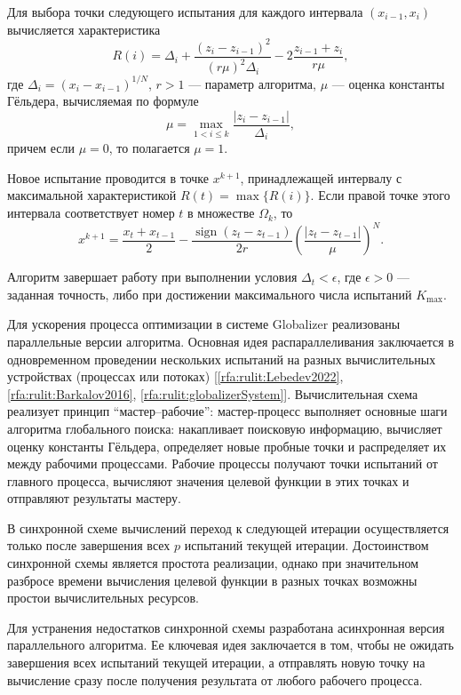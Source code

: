 \documentclass[10pt,a4paper]{book}
\begin{document}
Для выбора точки следующего испытания для каждого интервала $(x_{i-1}, x_i)$ вычисляется характеристика
\begin{equation}
R(i) = \Delta_i + \frac{(z_i - z_{i-1})^2}{(r\mu)^2\Delta_i} - 2\frac{z_{i-1} + z_i}{r\mu}, \label{eq_R}
\end{equation}
где $\Delta_i = (x_i - x_{i-1})^{1/N}$, $r>1$ --- параметр алгоритма, $\mu$ --- оценка константы Гёльдера, вычисляемая по формуле
\[
\mu = \max_{1 < i \leq k} \frac{|z_i - z_{i-1}|}{\Delta_i},
\]
причем если $\mu = 0$, то полагается $\mu = 1$.

Новое испытание проводится в точке $x^{k+1}$, принадлежащей интервалу с максимальной характеристикой $R(t) = \max\{R(i)\}$. Если правой точке этого интервала соответствует номер $t$ в множестве $\Omega_k$, то
\begin{equation}
x^{k+1} = \frac{x_t + x_{t-1}}{2} - \frac{\operatorname{sign}(z_t - z_{t-1})}{2r} \left( \frac{|z_t - z_{t-1}|}{\mu} \right)^N. \label{eq_x_new}
\end{equation}

Алгоритм завершает работу при выполнении условия $\Delta_t < \epsilon$, где $\epsilon > 0$ --- заданная точность, либо при достижении максимального числа испытаний $K_{\max}$.

Для ускорения процесса оптимизации в системе Globalizer реализованы параллельные версии алгоритма. Основная идея распараллеливания заключается в одновременном проведении нескольких испытаний на разных вычислительных устройствах (процессах или потоках) [\ref{rfa:rulit:Lebedev2022}, \ref{rfa:rulit:Barkalov2016}, \ref{rfa:rulit:globalizerSystem}]. Вычислительная схема реализует принцип ``мастер--рабочие'': мастер-процесс выполняет основные шаги алгоритма глобального поиска: накапливает поисковую информацию, вычисляет оценку константы Гёльдера, определяет новые пробные точки и распределяет их между рабочими процессами. Рабочие процессы получают точки испытаний от главного процесса, вычисляют значения целевой функции в этих точках и отправляют результаты мастеру.

В синхронной схеме вычислений переход к следующей итерации осуществляется только после завершения всех $p$ испытаний текущей итерации. Достоинством синхронной схемы является простота реализации, однако при значительном разбросе времени вычисления целевой функции в разных точках возможны простои вычислительных ресурсов.

Для устранения недостатков синхронной схемы разработана асинхронная версия параллельного алгоритма. Ее ключевая идея заключается в том, чтобы не ожидать завершения всех испытаний текущей итерации, а отправлять новую точку на вычисление сразу после получения результата от любого рабочего процесса.
\end{document}
